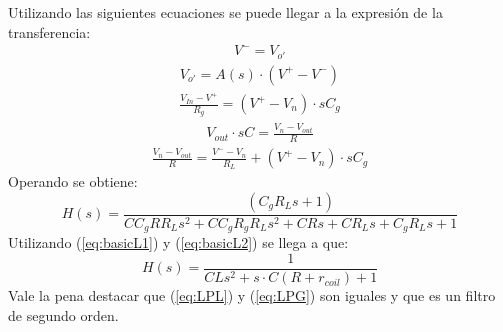 \documentclass[a4paper]{article}
\begin{document}
Utilizando las siguientes ecuaciones se puede llegar a la expresión de la transferencia:
\begin{align}V^- = V_{o'}\end{align}
\begin{align}V_{o'} = A(s)\cdot (V^+-V^-)\end{align}
\begin{align}\frac{V_{In}-V^+}{R_g}=(V^+-V_n)\cdot s C_g\end{align}
\begin{align}V_{out}\cdot s C=\frac{V_{n}-V_{out}}{R}\end{align}
\begin{align}\frac{V_{n}-V_{out}}{R}=\frac{V^--V_n}{R_L} +(V^+-V_n)\cdot s C_g\end{align}
Operando se obtiene:
\begin{equation} H(s)= \frac{\left(C_g R_L s + 1\right)}{C C_g R R_L s^{2} + C C_g R_g R_L s^{2} + C R s + C R_L s + C_g R_L s + 1}
\end{equation}
Utilizando (\ref{eq:basicL1}) y (\ref{eq:basicL2}) se llega a que:
\begin{equation} H(s)= \frac{1}{C L s^{2} + s\cdot C (R+r_{coil}) + 1}
\label{eq:LPG}
\end{equation}
Vale la pena destacar que (\ref{eq:LPL}) y (\ref{eq:LPG}) son iguales y que es un filtro de segundo orden.
\end{document}

